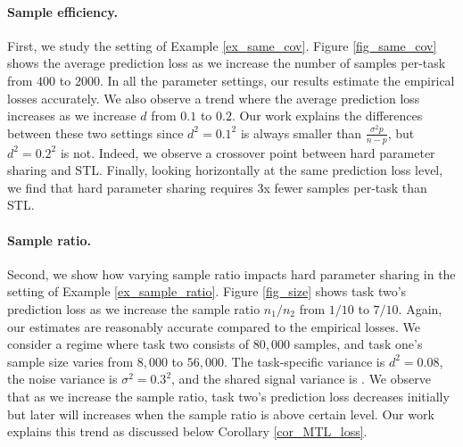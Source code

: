 \paragraph{Sample efficiency.}
First, we study the setting of Example \ref{ex_same_cov}.
Figure \ref{fig_same_cov} shows the average prediction loss as we increase the number of samples per-task   from $400$ to $2000$.
In all the parameter settings, our results estimate the empirical losses accurately.
We also observe a trend where the average prediction loss increases as we increase $d$ from $0.1$ to $0.2$.
Our work explains the differences between these two settings since $d^2 = 0.1^2$ is always smaller than $\frac{\sigma^2 p}{n - p}$, but $d^2 = 0.2^2$ is not.
Indeed, we observe a crossover point between hard parameter sharing and STL.
Finally, looking horizontally at the same prediction loss level, we find that hard parameter sharing requires 3x fewer samples per-task than STL. 

\paragraph{Sample ratio.}
Second, we show how varying sample ratio impacts hard parameter sharing in the setting of Example \ref{ex_sample_ratio}.
Figure \ref{fig_size} shows task two's prediction loss as we increase the sample ratio $n_1 / n_2$ from $1/10$ to $7/10$.
Again, our estimates are reasonably accurate compared to the empirical losses.
We consider a regime where task two consists of $80,000$ samples, and task one's sample size varies from $8,000$ to $56,000$. 
The  task-specific variance is $d^2 = 0.08$, the noise variance is $\sigma^2 = 0.3^2$, and the shared signal variance is . We observe that as we increase the sample ratio, task two's prediction loss decreases initially but later will increases when the sample ratio is above certain level.  Our work explains this trend as discussed below Corollary \ref{cor_MTL_loss}.

